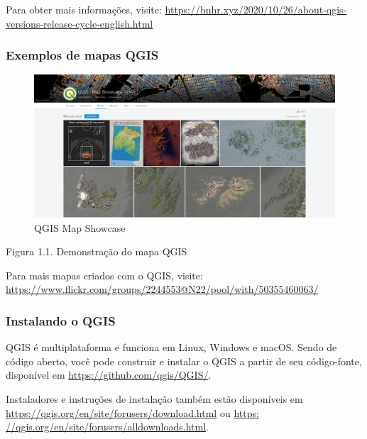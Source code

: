 \documentclass[
]{book}
\begin{document}
Para obter mais informações, visite: \href{https://bnhr.xyz/2020/10/26/\%20about-qgis-versions-release-cycle-english.html}{https://bnhr.xyz/2020/10/26/about-qgis-versions-release-cycle-english.html}

\hypertarget{exemplos-de-mapas-qgis}{%
\subsubsection{\texorpdfstring{\textbf{Exemplos de mapas QGIS}}{Exemplos de mapas QGIS}}\label{exemplos-de-mapas-qgis}}

\begin{figure}
\centering
\includegraphics{media/modulo1/qgis-map-showcase.png}
\caption{QGIS Map Showcase}
\end{figure}

Figura 1.1. Demonstração do mapa QGIS

Para mais mapas criados com o QGIS, visite: \href{https://www.flickr.com/groups/2244553@N22/\%20piscina/com/50355460063/}{https://www.flickr.com/groups/2244553@N22/pool/with/50355460063/}

\hypertarget{instalando-o-qgis}{%
\subsubsection{\texorpdfstring{\textbf{Instalando o QGIS}}{Instalando o QGIS}}\label{instalando-o-qgis}}

QGIS é multiplataforma e funciona em Linux, Windows e macOS. Sendo de código aberto, você pode construir e instalar o QGIS a partir de seu código-fonte, disponível em \url{https://github.com/qgis/QGIS/}.

Instaladores e instruções de instalação também estão disponíveis em \url{https://qgis.org/en/site/forusers/download.html} ou \href{https://qgis.org/en/site/forusers/alldownloads.html}{https: //qgis.org/en/site/forusers/alldownloads.html}.
\end{document}
